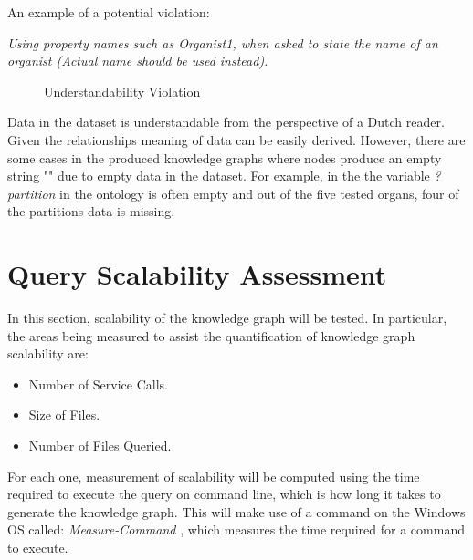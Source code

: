 \noindent An example of a potential violation: 
\vspace{-0.1cm}
\begin{displayquote}
    \textit{Using property names such as Organist1, when asked to state the name of an organist (Actual name should be used instead).}
\end{displayquote}

\begin{figure}[H]
\begin{center}
\end{center}
\vspace{-0.5cm}
\caption{Understandability Violation}
\end{figure}

Data in the dataset is understandable from the perspective of a Dutch reader. Given the relationships meaning of data can be easily derived. However, there are some cases in the produced knowledge graphs where nodes produce an empty string "" due to empty data in the dataset. For example, in the the variable \textit{?partition} in the ontology is often empty and out of the five tested organs, four of the partitions data is missing. 

\section{Query Scalability Assessment}
In this section, scalability of the knowledge graph will be tested. In particular, the areas being measured to assist the quantification of knowledge graph scalability are: 

\vspace{-0.1cm}
\begin{itemize}
\itemsep0cm
    \item Number of Service Calls.
    \vspace{-0.1cm}
    \item Size of Files.
    \vspace{-0.1cm}
    \item Number of Files Queried.
\end{itemize}
\vspace{-0.1cm}

For each one, measurement of scalability will be computed using the time required to execute the query on command line, which is how long it takes to generate the knowledge graph. This will make use of a command on the Windows OS called: \textit{Measure-Command} \cite{measurecommand}, which measures the time required for a command to execute. 

